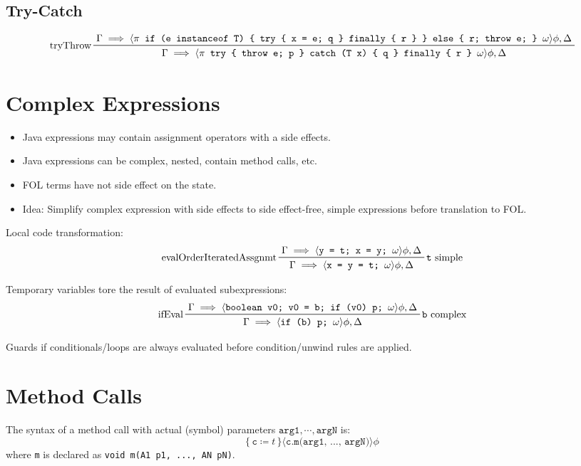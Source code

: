 		\subsection{Try-Catch}
			{ \footnotesize \begin{equation*}
				\prftree[l]
					{tryThrow}
					{\Gamma \implies \langle \pi \texttt{ if (e instanceof T) \{ try \{ x = e; q \} finally \{ r \} \} else \{ r; throw e; \} } \omega \rangle \phi, \Delta}
					{\Gamma \implies \langle \pi \texttt{ try \{ throw e; p \} catch (T x) \{ q \} finally \{ r \} } \omega \rangle \phi, \Delta}
			\end{equation*} }

	\section{Complex Expressions}
		\begin{itemize}
			\item Java expressions may contain assignment operators with a side effects.
			\item Java expressions can be complex, nested, contain method calls, etc.
			\item FOL terms have not side effect on the state.
			\item Idea: Simplify complex expression with side effects to side effect-free, simple expressions before translation to FOL.
		\end{itemize}
	
		Local code transformation:
		\begin{equation*}
			\prftree[l, r]
				{\texttt{t} simple}
				{evalOrderIteratedAssgnmt}
				{\Gamma \implies \langle \texttt{y = t; x = y; } \omega \rangle \phi, \Delta}
				{\Gamma \implies \langle \texttt{x = y = t; } \omega \rangle \phi, \Delta}
		\end{equation*}
		
		Temporary variables tore the result of evaluated subexpressions:
		\begin{equation*}
			\prftree[l, r]
				{\texttt{b} complex}
				{ifEval}
				{\Gamma \implies \langle \texttt{boolean v0; v0 = b; if (v0) p; } \omega \rangle \phi, \Delta}
				{\Gamma \implies \langle \texttt{if (b) p; } \omega \rangle \phi, \Delta}
		\end{equation*}
		
		Guards if conditionals/loops are always evaluated before condition/unwind rules are applied.

	\section{Method Calls}
		The syntax of a method call with actual (symbol) parameters \( \texttt{arg1}, \cdots, \texttt{argN} \) is:
		\begin{equation*}
			\{\, \texttt{c} \coloneqq t \,\} \langle \texttt{c.m(arg1, ..., argN)} \rangle \phi
		\end{equation*}
		where \texttt{m} is declared as \texttt{void m(A1 p1, ..., AN pN)}.
		

